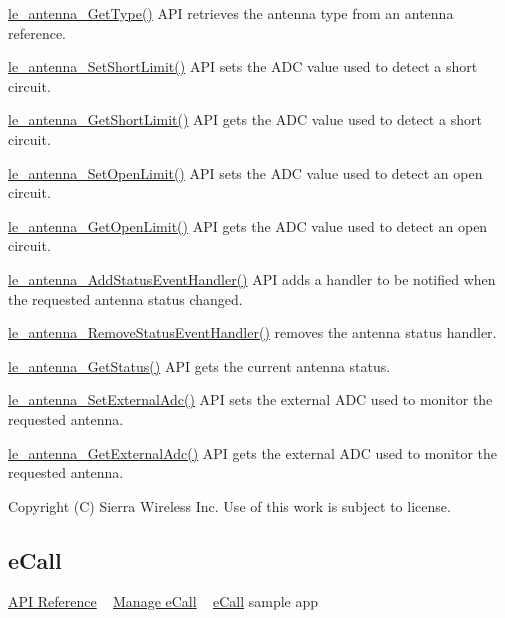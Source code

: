 \hyperlink{le__antenna__interface_8h_a7df2d56b7f495fa32ed3fd2063ae0f9e}{le\+\_\+antenna\+\_\+\+Get\+Type()} A\+P\+I retrieves the antenna type from an antenna reference.

\hyperlink{le__antenna__interface_8h_a0ccc004b9cd6927614b5b37565117f7a}{le\+\_\+antenna\+\_\+\+Set\+Short\+Limit()} A\+P\+I sets the A\+D\+C value used to detect a short circuit.

\hyperlink{le__antenna__interface_8h_ade26bb9f34339b6fbd392460069bc8bc}{le\+\_\+antenna\+\_\+\+Get\+Short\+Limit()} A\+P\+I gets the A\+D\+C value used to detect a short circuit.

\hyperlink{le__antenna__interface_8h_a436108eac97dbe9b6857ddc364243a9f}{le\+\_\+antenna\+\_\+\+Set\+Open\+Limit()} A\+P\+I sets the A\+D\+C value used to detect an open circuit.

\hyperlink{le__antenna__interface_8h_a79a575dbf942be4830cb87ce15853c2b}{le\+\_\+antenna\+\_\+\+Get\+Open\+Limit()} A\+P\+I gets the A\+D\+C value used to detect an open circuit.

\hyperlink{le__antenna__interface_8h_af45f8554ec619e0bea2e17cc8ab5d348}{le\+\_\+antenna\+\_\+\+Add\+Status\+Event\+Handler()} A\+P\+I adds a handler to be notified when the requested antenna status changed.

\hyperlink{le__antenna__interface_8h_a76157a271abcca5197656077cddf24ea}{le\+\_\+antenna\+\_\+\+Remove\+Status\+Event\+Handler()} removes the antenna status handler.

\hyperlink{le__antenna__interface_8h_a8d183e0c6168566527bd233f3fb07802}{le\+\_\+antenna\+\_\+\+Get\+Status()} A\+P\+I gets the current antenna status.

\hyperlink{le__antenna__interface_8h_a691370edf658b655a0f72b285dc5d00a}{le\+\_\+antenna\+\_\+\+Set\+External\+Adc()} A\+P\+I sets the external A\+D\+C used to monitor the requested antenna.

\hyperlink{le__antenna__interface_8h_a095510ac1da6efaf15db134321a012b3}{le\+\_\+antenna\+\_\+\+Get\+External\+Adc()} A\+P\+I gets the external A\+D\+C used to monitor the requested antenna.





Copyright (C) Sierra Wireless Inc. Use of this work is subject to license. \hypertarget{c_ecall}{}\subsection{e\+Call}\label{c_ecall}
\hyperlink{le__ecall__interface_8h}{A\+P\+I Reference} ~\newline
 \hyperlink{howToEcall}{Manage e\+Call} ~\newline
 \hyperlink{sampleApps_eCall}{e\+Call} sample app





